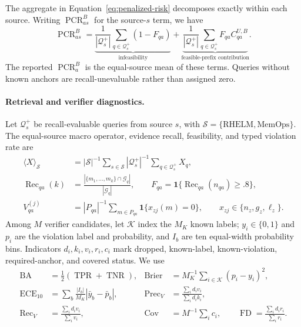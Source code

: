 \documentclass{article}
\begin{document}
The aggregate in Equation~\ref{eq:penalized-risk} decomposes exactly within each
source.  Writing $\operatorname{PCR}^{B}_{as}$ for the source-$s$ term, we have
\begin{equation}
\operatorname{PCR}^{B}_{as}
=\underbrace{\frac{1}{|\mathcal{Q}^{+}_s|}\sum_{q\in\mathcal{Q}^{+}_s}(1-F_{qa})}_{\text{infeasibility}}
+\underbrace{\frac{1}{|\mathcal{Q}^{+}_s|}\sum_{q\in\mathcal{Q}^{+}_s}
F_{qa}C^{U,B}_{qa}}_{\text{feasible-prefix contribution}}.
\label{eq:risk-decomposition}
\end{equation}
The reported $\operatorname{PCR}^{B}_{a}$ is the equal-source mean of these terms.
Queries without known anchors are recall-unevaluable rather than assigned zero.

\paragraph{Retrieval and verifier diagnostics.}
Let $\mathcal Q_s^+$ be recall-evaluable queries from source $s$, with
$\mathcal S=\{\mathrm{RHELM},\mathrm{MemOps}\}$.  The equal-source macro operator,
evidence recall, feasibility, and typed violation rate are
\begin{align}
\langle X\rangle_{\mathcal S}
&=|\mathcal S|^{-1}\sum_{s\in\mathcal S}|\mathcal Q_s^+|^{-1}
  \sum_{q\in\mathcal Q_s^+}X_q,\\
\operatorname{Rec}_{qa}(k)
&=\frac{|\{m_1,\ldots,m_k\}\cap\mathcal G_q|}{|\mathcal G_q|},\qquad
F_{qa}=\mathbf 1\{\operatorname{Rec}_{qa}(n_{qa})\geq .8\},
\label{eq:retrieval-outcomes}\\
V^{(j)}_{qa}
&=|P_{qa}|^{-1}\sum_{m\in P_{qa}}\mathbf 1\{x_{zj}(m)=0\},\qquad
x_{zj}\in\{n_z,g_z,\ell_z\}.
\label{eq:typed-violation}
\end{align}
Among $M$ verifier candidates, let $\mathcal K$ index the $M_K$ known labels;
$y_i\in\{0,1\}$ and $p_i$ are the violation label and probability, and $I_b$ are
ten equal-width probability bins.  Indicators $d_i,k_i,v_i,r_i,c_i$ mark dropped,
known-label, known-violation, required-anchor, and covered status.  We use
\begin{align}
\operatorname{BA}
&=\tfrac12(\operatorname{TPR}+\operatorname{TNR}), &
\operatorname{Brier}
&=M_K^{-1}\sum_{i\in\mathcal K}(p_i-y_i)^2,\\
\operatorname{ECE}_{10}
&=\sum_b\frac{|I_b|}{M_K}|\bar y_b-\bar p_b|, &
\operatorname{Prec}_{V}
&=\frac{\sum_i d_iv_i}{\sum_i d_ik_i},
\label{eq:verification-calibration}\\
\operatorname{Rec}_{V}
&=\frac{\sum_i d_iv_i}{\sum_i v_i}, &
\operatorname{Cov}
&=M^{-1}\sum_i c_i,\qquad
\operatorname{FD}=\frac{\sum_i d_ir_i}{\sum_i r_i}.
\label{eq:filter-diagnostics}
\end{align}
\end{document}
